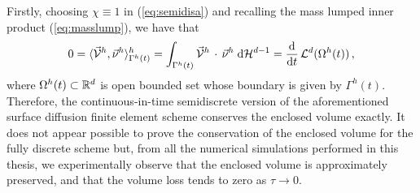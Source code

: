 Firstly, choosing $\chi \equiv 1$ in (\ref{eq:semidisa}) and recalling the mass
lumped inner product (\ref{eq:masslump}), we have that
\begin{equation}\label{eq:vol}
0 = \langle \vec{\mathcal{V}}^h, \vec \nu^h \rangle^h_{\Gamma^h(t)}
= \int_{\Gamma^h(t)} \vec{\mathcal{V}}^h\, \cdot \, \vec \nu^h \;{\rm d}{\cal H}^{d-1}
= \frac{\rm d}{{\rm d}t} \, \mathcal{L}^d(\Omega^h(t)) \,,
\end{equation}
where $\Omega^h(t) \subset \mathbb R^d$ is open bounded set whose boundary is
given by $\Gamma^h(t)$. Therefore, the continuous-in-time semidiscrete version
of the aforementioned surface diffusion finite element scheme conserves the
enclosed volume exactly. It does not appear possible to prove the conservation
of the enclosed volume for the fully discrete scheme but, from all the
numerical simulations performed in this thesis, we experimentally observe that
the enclosed volume is approximately preserved, and that the volume loss tends
to zero as $\tau \to 0$.

